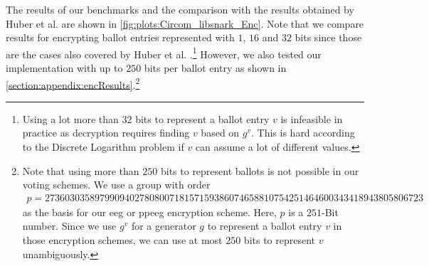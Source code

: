 The results of our benchmarks and the comparison with the results obtained by Huber et al. are shown in \cref{fig:plots:Circom_libsnark_Enc}.
Note that we compare results for encrypting ballot entries represented with $1$, $16$ and $32$ bits since those are the cases also covered by Huber et al. \cite{huber_zk-snarks_2025}.\footnote{
    \label{footnote:bitPracticalityEnc}
    Using a lot more than $32$ bits to represent a ballot entry $v$ is infeasible in practice as decryption requires finding $v$ based on $g^v$.
    This is hard according to the Discrete Logarithm problem if $v$ can assume a lot of different values.
}
However, we also tested our implementation with up to $250$ bits per ballot entry as shown in \cref{section:appendix:encResults}.\footnote{
    \label{footnote:bitLimitEnc}
    Note that using more than $250$ bits to represent ballots is not possible in our voting schemes.
    We use a group with order 
    \begin{align*}
        p=2736030358979909402780800718157159386074658810754251464600343418943805806723
    \end{align*}
    as the basis for our \gls{eeg} or \gls{ppeeg} encryption scheme.
    Here, $p$ is a $251$-Bit number. 
    Since we use $g^{v}$ for a generator $g$ to represent a ballot entry $v$ in those encryption schemes, we can use at most $250$ bits to represent $v$ unambiguously.
}



